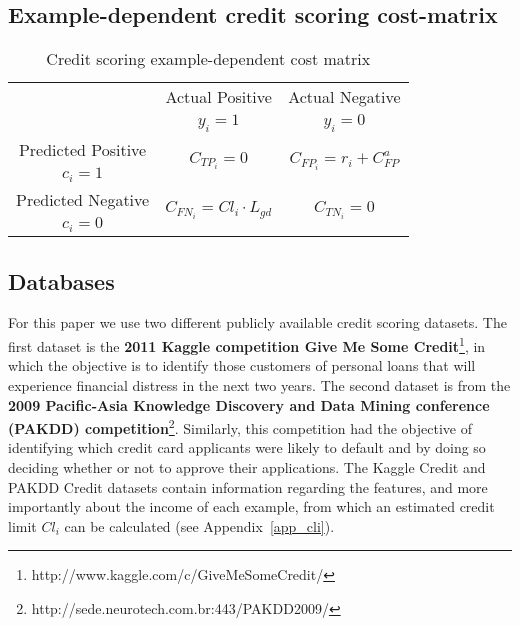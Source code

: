   \subsection{Example-dependent credit scoring cost-matrix}
  \begin{table}
  \caption{Credit scoring example-dependent cost matrix}\label{table_costmat2}
    \centering
    \begin{tabular}{c|c|c}
      \multicolumn{1}{c|}{}  & Actual Positive& Actual Negative \\
      \multicolumn{1}{c|}{} & $y_i=1$& $y_i=0$ \\
      \hline
      Predicted Positive& \multirow{ 2}{*}{$C_{TP_i}=0$} & \multirow{2}{*}{$C_{FP_i}=r_i+C^a_{FP}$} 
      \\
      $c_i=1$ & &\\
      \hline
      Predicted Negative& \multirow{ 2}{*}{$C_{FN_i}=Cl_i \cdot L_{gd}$} & \multirow{
      2}{*}{$C_{TN_i}=0$} \\
      $c_i=0$ & &\\
    \end{tabular}
  \end{table}
   

  \subsection{Databases}

    For this paper we use two different publicly available credit scoring datasets. The first 
    dataset is the \textbf{2011 Kaggle competition Give Me Some Credit}\footnote{ 
    http://www.kaggle.com/c/GiveMeSomeCredit/}, in which the objective is to identify those 
    customers of personal loans that will experience financial distress in the next two years.
    The second dataset is from the \textbf{2009 Pacific-Asia Knowledge Discovery and Data Mining 
    conference (PAKDD) competition}\footnote{http://sede.neurotech.com.br:443/PAKDD2009/}.
    Similarly, this competition had the objective of identifying which credit card applicants
    were likely to default and by doing so deciding whether or not to approve their applications.
    The Kaggle Credit and PAKDD Credit datasets contain information regarding the features, and 
    more importantly about the income of each example, from which an estimated credit limit 
    $Cl_i$ can be calculated (see Appendix~\ref{app_cli}).
    
